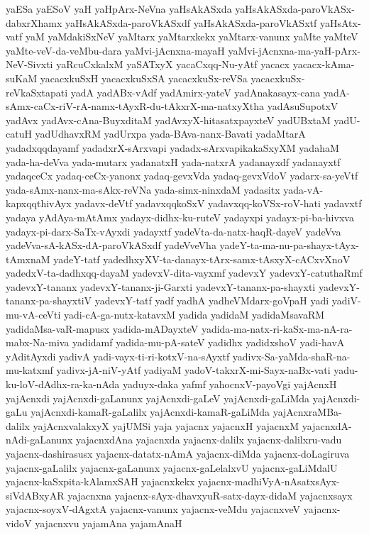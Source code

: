 {yaESa
yaESoV
yaH
yaHpArx-NeVna
yaHsAkASxda
yaHsAkASxda-paroVkASx-dabxrXhamx
yaHsAkASxda-paroVkASxdf
yaHsAkASxda-paroVkASxtf
yaHsAtx-vatf
yaM
yaMdakiSxNeV
yaMtarx
yaMtarxkekx
yaMtarx-vanunx
yaMte
yaMteV
yaMte-veV-da-veMbu-dara
yaMvi-jAcnxna-mayaH
yaMvi-jAcnxna-ma-yaH-pArx-NeV-Sivxti
yaRcuCxkalxM
yaSATxyX
yacaCxqq-Nu-yAtf
yacacx
yacacx-kAma-suKaM
yacacxkuSxH
yacacxkuSxSA
yacacxkuSx-reVSa
yacacxkuSx-reVkaSxtapati
yadA
yadABx-vAdf
yadAmirx-yateV
yadAnakasayx-cana
yadA-sAmx-caCx-riV-rA-namx-tAyxR-du-tAkxrX-ma-natxyXtha
yadAsuSupotxV
yadAvx
yadAvx-cAna-BuyxditaM
yadAvxyX-hitasatxpayxteV
yadUBxtaM
yadU-catuH
yadUdhavxRM
yadUrxpa
yada-BAva-nanx-Bavati
yadaMtarA
yadadxqqdayamf
yadadxrX-sArxvapi
yadadx-sArxvapikakaSxyXM
yadahaM
yada-ha-deVva
yada-mutarx
yadanatxH
yada-natxrA
yadanayxdf
yadanayxtf
yadaqceCx
yadaq-ceCx-yanonx
yadaq-gevxVda
yadaq-gevxVdoV
yadarx-sa-yeVtf
yada-sAmx-nanx-ma-sAkx-reVNa
yada-simx-ninxdaM
yadasitx
yada-vA-kapxqqthivAyx
yadavx-deVtf
yadavxqqkoSxV
yadavxqq-koVSx-roV-hati
yadavxtf
yadaya
yAdAya-mAtAmx
yadayx-didhx-ku-ruteV
yadayxpi
yadayx-pi-ba-hivxva
yadayx-pi-darx-SaTx-vAyxdi
yadayxtf
yadeVta-da-natx-haqR-dayeV
yadeVva
yadeVva-sA-kASx-dA-paroVkASxdf
yadeVveVha
yadeY-ta-ma-nu-pa-shayx-tAyx-tAmxnaM
yadeY-tatf
yadedhxyXV-ta-danayx-tArx-samx-tAsxyX-cACxvXnoV
yadedxV-ta-dadhxqq-dayaM
yadevxV-dita-vayxmf
yadevxY
yadevxY-catuthaRmf
yadevxY-tananx
yadevxY-tananx-ji-Garxti
yadevxY-tananx-pa-shayxti
yadevxY-tananx-pa-shayxtiV
yadevxY-tatf
yadf
yadhA
yadheVMdarx-goVpaH
yadi
yadiV-mu-vA-ceVti
yadi-cA-ga-nutx-katavxM
yadida
yadidaM
yadidaMsavaRM
yadidaMsa-vaR-mapusx
yadida-mADayxteV
yadida-ma-natx-ri-kaSx-ma-nA-ra-mabx-Na-miva
yadidamf
yadida-mu-pA-sateV
yadidhx
yadidxshoV
yadi-havA
yAditAyxdi
yadivA
yadi-vayx-ti-ri-kotxV-na-sAyxtf
yadivx-Sa-yaMda-shaR-na-mu-katxmf
yadivx-jA-niV-yAtf
yadiyaM
yadoV-takxrX-mi-Sayx-naBx-vati
yadu-ku-loV-dAdhx-ra-ka-nAda
yaduyx-daka
yafmf
yahocnxV-payoVgi
yajAcnxH
yajAcnxdi
yajAcnxdi-gaLanunx
yajAcnxdi-gaLeV
yajAcnxdi-gaLiMda
yajAcnxdi-gaLu
yajAcnxdi-kamaR-gaLalilx
yajAcnxdi-kamaR-gaLiMda
yajAcnxraMBa-dalilx
yajAcnxvalakxyX
yajUMSi
yaja
yajacnx
yajacnxH
yajacnxM
yajacnxdA-nAdi-gaLanunx
yajacnxdAna
yajacnxda
yajacnx-dalilx
yajacnx-dalilxru-vadu
yajacnx-dashirasusx
yajacnx-datatx-nAmA
yajacnx-diMda
yajacnx-doLagiruva
yajacnx-gaLalilx
yajacnx-gaLanunx
yajacnx-gaLelalxvU
yajacnx-gaLiMdalU
yajacnx-kaSxpita-kAlamxSAH
yajacnxkekx
yajacnx-madhiVyA-nAsatxsAyx-siVdABxyAR
yajacnxna
yajacnx-sAyx-dhavxyuR-satx-dayx-didaM
yajacnxsayx
yajacnx-soyxV-dAgxtA
yajacnx-vanunx
yajacnx-veMdu
yajacnxveV
yajacnx-vidoV
yajacnxvu
yajamAna
yajamAnaH
}
